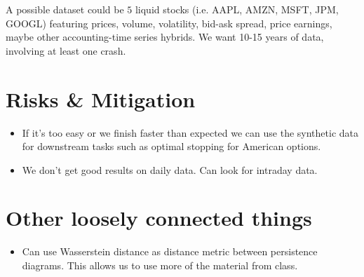 \documentclass{article}
\begin{document}
A possible dataset could be $5$ liquid stocks (i.e. AAPL, AMZN, MSFT, JPM, GOOGL) featuring prices, volume, volatility, bid-ask spread, price earnings, maybe other accounting-time series hybrids. We want 10-15 years of data, involving at least one crash. 

\section{Risks \& Mitigation}
\begin{itemize}
    \item If it's too easy or we finish faster than expected we can use the synthetic data for downstream tasks such as optimal stopping for American options. 
    \item We don't get good results on daily data. Can look for intraday data.
\end{itemize}

\section{Other loosely connected things}
\begin{itemize}
    \item Can use Wasserstein distance as distance metric between persistence diagrams. This allows us to use more of the material from class.
\end{itemize}

\printbibliography
\end{document}
